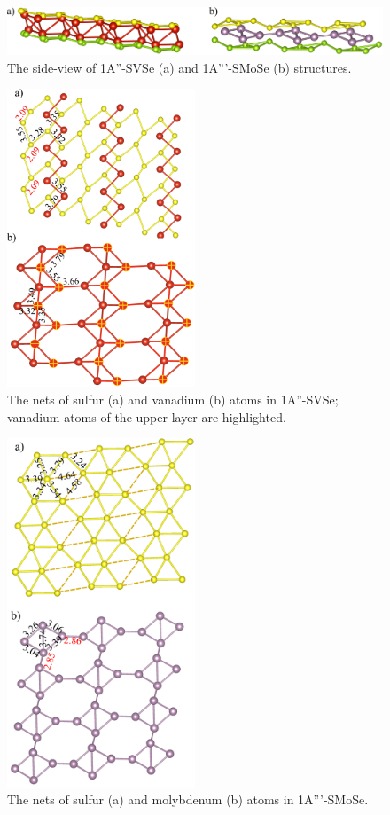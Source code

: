 \documentclass[a4paperm]{article}
\begin{document}
\begin{figure}[H]
	\includegraphics[width=\textwidth]{airss3_side.png}
	\caption{The side-view of 1A''-SVSe (a) and 1A'''-SMoSe (b) structures.}
	\label{airss3_side}
\end{figure}

\begin{figure}[H]
	\includegraphics[width=0.5\textwidth]{airss3_svse.png}
	\caption{The nets of sulfur (a) and vanadium (b) atoms in 1A''-SVSe; vanadium atoms of the upper layer are highlighted.}
	\label{airss3_svse}
\end{figure}

\begin{figure}[H]
	\includegraphics[width=0.5\textwidth]{airss3_smose.png}
	\caption{The nets of sulfur (a) and molybdenum (b) atoms in 1A'''-SMoSe.}
	\label{airss3_smose}
\end{figure}
\end{document}
